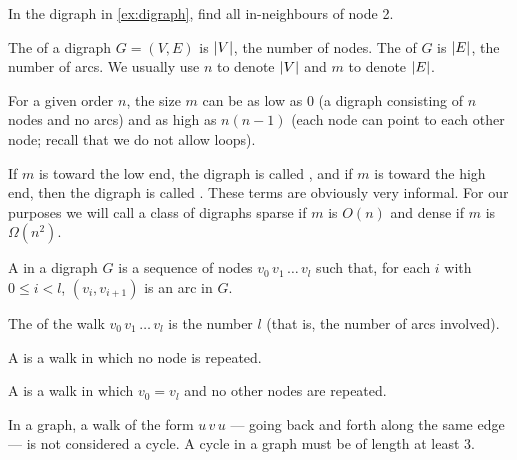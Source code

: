 \begin{Boxample}[2]
In the digraph in \cref{ex:digraph}, find all in-neighbours of node 2.
\end{Boxample}


%


\begin{Definition} 
The  of a digraph $G = (V, E)$ is $\lvert V\rvert$, the number of nodes. 
The  of $G$ is $\lvert E\rvert$, the number of arcs. 
We usually use $n$ to denote $\lvert V\rvert$ and $m$ to denote $\lvert E\rvert$.
\end{Definition}
 

For a given order $n$, the size $m$ can be as low as $0$ (a digraph consisting of $n$ nodes and no arcs)  
and as high as $n(n-1)$ (each node can point to each other node; recall that we do not allow loops).

\begin{Definition}  
If $m$ is toward the low end, the digraph is called , 
and if $m$ is toward the high end, then the digraph is called . 
These terms are obviously very informal. 
For our purposes we will call a class of digraphs sparse if $m$ is $O(n)$ and dense if $m$ is $\Omega(n^2)$.
\end{Definition}


\begin{Definition} 
A  in a digraph $G$ is a sequence of nodes $v_0\, v_1\, \ldots\, v_l$ 
such that, for each $i$ with $0 \leq i < l$, $(v_i, v_{i+1})$ is an arc in $G$. 

The  of the walk $v_0\, v_1\, \ldots \,v_l$ is the number $l$ (that is, the number of arcs involved).

A  is a walk in which no node is repeated. 

A  is a walk in which $v_0 = v_l$ and no other nodes
are repeated.
\end{Definition}

In a graph, a walk of the form $u\, v\, u$ --- going back and forth along the same edge --- is not considered a cycle.  A cycle in a graph must be of length at least $3$.


